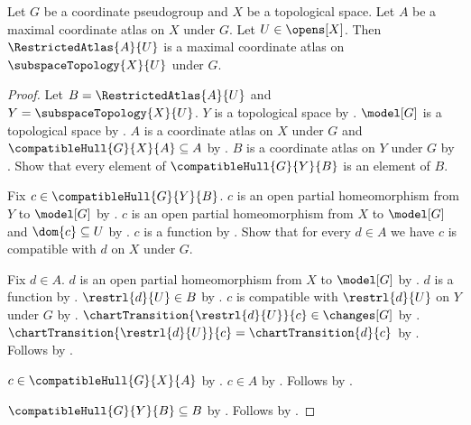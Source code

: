 \begin{classification}\label{restricted_maximal_atlas_is_maximal}
    Let $G$ be a coordinate pseudogroup and $X$ be a topological space.
    Let $A$ be a maximal coordinate atlas on $X$ under $G$.
    Let $U\in\opens[X]$.
    Then $\RestrictedAtlas{A}{U}$ is a maximal coordinate atlas on $\subspaceTopology{X}{U}$ under $G$.
\end{classification}
\begin{proof}
    Let $B=\RestrictedAtlas{A}{U}$ and $Y=\subspaceTopology{X}{U}$.
    $Y$ is a topological space by .
    $\model[G]$ is a topological space by .
    $A$ is a coordinate atlas on $X$ under $G$ and $\compatibleHull{G}{X}{A}\subseteq A$ by
        .
    $B$ is a coordinate atlas on $Y$ under $G$ by .
    Show that every element of $\compatibleHull{G}{Y}{B}$ is an element of $B$.
    \begin{subproof}
        Fix $c\in\compatibleHull{G}{Y}{B}$.
        $c$ is an open partial homeomorphism from $Y$ to $\model[G]$ by .
        $c$ is an open partial homeomorphism from $X$ to $\model[G]$ and $\dom{c}\subseteq U$ by
            .
        $c$ is a function by .
        Show that for every $d\in A$ we have $c$ is compatible with $d$ on $X$ under $G$.
        \begin{subproof}
            Fix $d\in A$.
            $d$ is an open partial homeomorphism from $X$ to $\model[G]$ by .
            $d$ is a function by .
            $\restrl{d}{U}\in B$ by .
            $c$ is compatible with $\restrl{d}{U}$ on $Y$ under $G$ by .
            $\chartTransition{\restrl{d}{U}}{c}\in\changes[G]$ by .
            $\chartTransition{\restrl{d}{U}}{c}=\chartTransition{d}{c}$ by
                .
            Follows by .
        \end{subproof}
        $c\in\compatibleHull{G}{X}{A}$ by .
        $c\in A$ by .
        Follows by .
    \end{subproof}
    $\compatibleHull{G}{Y}{B}\subseteq B$ by .
    Follows by .
\end{proof}

